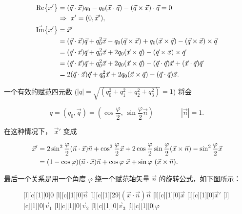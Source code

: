 \begin{align*}
\textrm{Re}\big\{ x' \big\} &= (\vec{q} \cdot \vec{x})q_0 - q_0(\vec{x} \cdot \vec{q}) - (\vec{q} \times \vec{x}) \cdot \vec{q} = 0 \\
                    &\Rightarrow \ x' = (0,\vec{x}'), \\
\vec{\textrm{Im}}\big\{ x' \big\} &= \vec{x}' \\
										&= (\vec{q} \cdot \vec{x}) \vec{q} + q_0^2\vec{x} - q_0(\vec{q}\times\vec{x}) + q_0(\vec{x}\times\vec{q}) - (\vec{q}\times\vec{x}) \times\vec{q} \\
                    &= (\vec{q} \cdot \vec{x}) \vec{q} + q_0^2\vec{x} + 2 q_0(\vec{x}\times\vec{q}) - (\vec{q}\times\vec{x}) \times\vec{q} \\
    &= (\vec{q} \cdot \vec{x}) \vec{q} + q_0^2\vec{x} + 2 q_0(\vec{x}\times\vec{q}) - (\vec{q}\cdot\vec{q})\vec{x} + (\vec{x}\cdot\vec{q})\vec{q} \\
    &= 2(\vec{q} \cdot \vec{x}) \vec{q} + q_0^2\vec{x} + 2 q_0(\vec{x}\times\vec{q}) - (\vec{q}\cdot\vec{q})\vec{x}.
\end{align*}


一个有效的赋范四元数 ($|q|=\sqrt{(q_0^2+q_1^2+q_2^2+q_3^2)}=1$) 将会

\begin{equation*}
q = (q_0, \vec{q}) = (\cos\frac{\varphi}{2},\ \sin\frac{\varphi}{2}\vec{n}) \qquad \qquad |\vec{n}|=1.
\end{equation*}

在这种情况下， $\vec{x}'$ 变成 

\begin{align*}
\vec{x}'  &=  
2 \sin^2\frac{\varphi}{2} (\vec{n}\cdot\vec{x})\vec{n} + \cos^2\frac{\varphi}{2} \vec{x} + 2 \cos\frac{\varphi}{2} \sin\frac{\varphi}{2} (\vec{x}\times\vec{n}) - \sin^2\frac{\varphi}{2} \vec{x} \\
         &= (1-\cos\varphi)(\vec{n}\cdot\vec{x}) \vec{n}  + \cos\varphi\ \vec{x} + \sin\varphi\ (\vec{x}\times\vec{n}).
\end{align*}

最后一个关系是用一个角度 $\varphi$ 绕一个赋范轴矢量 $\vec{n}$ 的旋转公式，如下图所示：

\begin{figure}
\begin{center}
[l][c][1][0]{$0$}
[l][c][1][0]{$\vec{n}$}
[l][c][1][29]{$(\vec{x}\cdot\vec{n})\vec{n}$}
[l][c][1][0]{$\vec{x}$}
[l][c][1][0]{$\vec{x}'$}
[l][c][1][0]{$\vec{v}_1$}
[l][c][1][0]{$\vec{v}_2$}
[l][c][1][0]{$\vec{v}_3$}
[l][c][1][0]{$\varphi$}
\end{center}
\end{figure}



